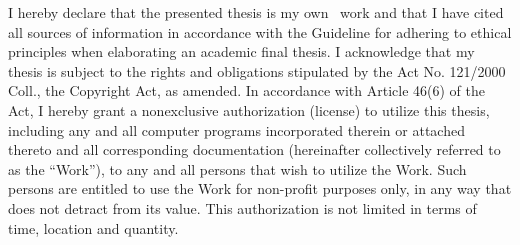\documentclass[english,bachelor,unicode]{ctufit-thesis}
\theoremstyle{plain}
\theoremstyle{definition}
\theoremstyle{remark}
\numberwithin{theorem}{chapter}
\begin{document}
\begin{declarationpage}
I  hereby  declare  that  the  presented  thesis  is  my  own \
work  and  that  I  have  cited  all sources  of  information  in  accordance  with  the  Guideline  for  adhering  to  ethical principles when elaborating an academic final thesis. I acknowledge that my thesis is subject to the rights and obligations stipulated by the Act No. 121/2000 Coll., the Copyright Act, as amended. In accordance with Article 46(6) of  the  Act,  I  hereby  grant  a  nonexclusive  authorization  (license)  to  utilize  this  thesis, including any and all computer programs incorporated therein or attached thereto and all corresponding documentation (hereinafter collectively referred to as the “Work”), to any and all persons that wish to utilize the Work. Such persons are entitled to use the Work for non-profit purposes only, in any way that does not detract from its value. This authorization is not limited in terms of time, location and quantity.
\end{declarationpage}

\printabstractpage %

\end{document}
